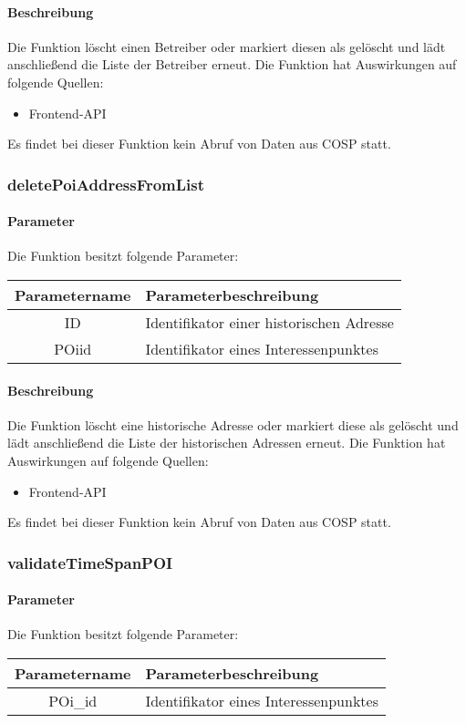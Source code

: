 \paragraph{Beschreibung} Die Funktion löscht einen Betreiber oder markiert diesen als gelöscht und lädt anschließend die Liste der Betreiber erneut. Die Funktion hat Auswirkungen auf folgende Quellen:
\begin{itemize}
	\item Frontend-API
\end{itemize}
Es findet bei dieser Funktion kein Abruf von Daten aus {\glqq COSP\grqq} statt.
\subsubsection{deletePoiAddressFromList}
\paragraph{Parameter} Die Funktion besitzt folgende Parameter:
\begin{table}[H]
	\begin{tabular}{|c|p{11cm}|}
		\hline
		\textbf{Parametername} & \textbf{Parameterbeschreibung} \\ \hline
		ID    & Identifikator einer historischen Adresse \\ \hline
		POiid & Identifikator eines Interessenpunktes \\ \hline
	\end{tabular}
\end{table}
\paragraph{Beschreibung} Die Funktion löscht eine historische Adresse oder markiert diese als gelöscht und lädt anschließend die Liste der historischen Adressen erneut. Die Funktion hat Auswirkungen auf folgende Quellen:
\begin{itemize}
	\item Frontend-API
\end{itemize}
Es findet bei dieser Funktion kein Abruf von Daten aus {\glqq COSP\grqq} statt.
\subsubsection{validateTimeSpanPOI}
\paragraph{Parameter} Die Funktion besitzt folgende Parameter:
\begin{table}[H]
	\begin{tabular}{|c|p{11cm}|}
		\hline
		\textbf{Parametername} & \textbf{Parameterbeschreibung} \\ \hline
		POi\_id & Identifikator eines Interessenpunktes \\ \hline
	\end{tabular}
\end{table}
